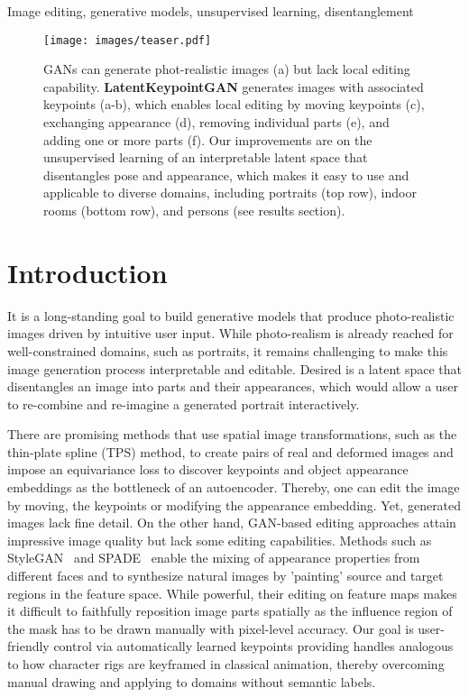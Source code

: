 \documentclass[10pt, conference, compsocconf]{IEEEtran}
\begin{document}
\begin{IEEEkeywords}
Image editing, generative models, unsupervised learning, disentanglement
\end{IEEEkeywords} \begin{figure*}
\centering
   \texttt{[image: images/teaser.pdf]}
\caption{GANs can generate phot-realistic images (a) but lack local editing capability. \textbf{LatentKeypointGAN} generates images with associated keypoints (a-b), which enables local editing by moving keypoints (c), exchanging appearance (d), removing individual parts (e), and adding one or more parts (f). Our improvements are on the unsupervised learning of an interpretable latent space that disentangles pose and appearance, which makes it easy to use and applicable to diverse domains, including portraits (top row), indoor rooms (bottom row), and persons (see results section).}\label{fig:teaser}
\end{figure*} \section{Introduction} \label{sec:intro}

\vspace{0.01cm}
It is a long-standing goal to build generative models that produce photo-realistic images driven by intuitive user input. 
While photo-realism is already reached for well-constrained domains, such as portraits, it remains challenging to make this image generation process interpretable and editable. 
Desired is a latent space that disentangles an image into parts and their appearances, which would allow a user to re-combine and re-imagine a generated portrait interactively. 

There are promising methods
\cite{zhang2018unsupervised, jakab2018unsupervised, lorenz2019unsupervised}
that use spatial image transformations, such as the thin-plate spline (TPS) method, to create pairs of real and deformed images and impose an equivariance loss to discover keypoints and object appearance embeddings as the bottleneck of an autoencoder. 
Thereby, one can edit the image by moving, the keypoints or modifying the appearance embedding. 
Yet, generated images lack fine detail. On the other hand, GAN-based editing approaches attain impressive image quality but lack some editing capabilities. 
Methods such as StyleGAN~\cite{karras2019style, karras2020analyzing} and SPADE~\cite{park2019semantic} enable the mixing of appearance properties from different faces and to synthesize natural images by 'painting' source and target regions in the feature space. 
While powerful, their editing on feature maps makes it difficult to faithfully reposition image parts spatially as the influence region of the mask has to be drawn manually with pixel-level accuracy. Our goal is user-friendly control via automatically learned keypoints providing handles analogous to how character rigs are keyframed in classical animation, thereby overcoming manual drawing and applying to domains without semantic labels.
\end{document}
